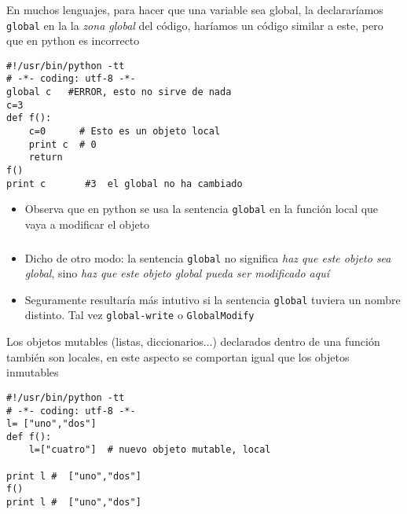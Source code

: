 \documentclass[ucs]{beamer}
\begin{document}
\begin{frame}[fragile]
\frametitle{}
En muchos lenguajes, para hacer que una variable sea global,
la declararíamos \verb|global| en la
la \emph{zona global} del código, haríamos un código similar
a este, pero que en python es incorrecto
  \begin{footnotesize}
  \begin{verbatim}
#!/usr/bin/python -tt
# -*- coding: utf-8 -*-
global c   #ERROR, esto no sirve de nada
c=3
def f():
    c=0      # Esto es un objeto local
    print c  # 0
    return 
f()
print c       #3  el global no ha cambiado
  \end{verbatim}
  \end{footnotesize}


\begin{itemize}
\item
Observa que en python se usa la sentencia 
\verb|global| en la función local que vaya a modificar
el objeto
\end{itemize}
\end{frame}



\begin{frame}[fragile]
\frametitle{}
\begin{itemize}
\item
Dicho de otro modo: la sentencia 
\verb|global| no significa \emph{haz que este objeto sea global}, sino
\emph{haz que este objeto global pueda ser modificado aquí}
\item
Seguramente resultaría más intutivo si la sentencia \verb|global|
tuviera un nombre distinto. Tal vez 
\verb|global-write|
o
\verb|GlobalModify|
\end{itemize}

\end{frame}


\begin{frame}[fragile]
Los objetos mutables (listas, diccionarios...) declarados dentro de una función 
también son locales, en este aspecto se comportan igual que los objetos inmutables
  \begin{scriptsize}
  \begin{verbatim}
#!/usr/bin/python -tt
# -*- coding: utf-8 -*-
l= ["uno","dos"]
def f():
    l=["cuatro"]  # nuevo objeto mutable, local

print l #  ["uno","dos"]
f()
print l #  ["uno","dos"]
  \end{verbatim}
  \end{scriptsize}
\end{frame}
\end{document}
